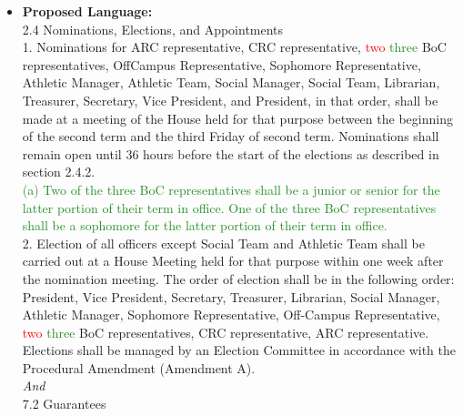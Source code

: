 \documentclass[10pt]{article} %
\begin{document}
\begin{itemize}
	(b) for the entire academic year following the election or appointment provided the officer completes their term. If an officer quits their office mid-term, the room guarantee shall transfer to the succeeding officeholder for the remainder of the guaranteed term. \\
	8. The officer room pick order shall be President, Vice President, Secretary, Treasurer, Librarian, Social Manager, Athletic Manager, Head UCC, On Campus UCCs, IHC Chair, ASCIT President, BoC Chair, Social Team, Athletic Team, House-elected BoC Representatives (up to two members), O'Domhnaill's Suppliers (up to two members), House Head Waiter (one member), House BFD editors (one member), House Historians (one member).
	\item \textbf{Proposed Language:} \\
	2.4 Nominations, Elections, and Appointments \\
	1. Nominations for ARC representative, CRC representative, \textcolor{red}{two} \textcolor{ForestGreen}{three} BoC representatives, OffCampus Representative, Sophomore Representative, Athletic Manager, Athletic Team, Social Manager, Social Team, Librarian, Treasurer, Secretary, Vice President, and President, in that order, shall be made at a meeting of the House held for that purpose between the beginning of the second term and the third Friday of second term. Nominations shall remain open until 36 hours before the start of the elections as described in section 2.4.2. \\
	\textcolor{ForestGreen}{(a) Two of the three BoC representatives shall be a junior or senior for the latter portion of their term in office. One of the three BoC representatives shall be a sophomore for the latter portion of their term in office.} \\
	2. Election of all officers except Social Team and Athletic Team shall be carried out at a House Meeting held for that purpose within one week after the nomination meeting. The order of election shall be in the following order: President, Vice President, Secretary, Treasurer, Librarian, Social Manager, Athletic Manager, Sophomore Representative, Off-Campus Representative, \textcolor{red}{two} \textcolor{ForestGreen}{three} BoC representatives, CRC representative, ARC representative. Elections shall be managed by an Election Committee in accordance with the Procedural Amendment (Amendment A). \\
	\textit{And} \\
	7.2 Guarantees \\

\end{itemize}
\end{document}
